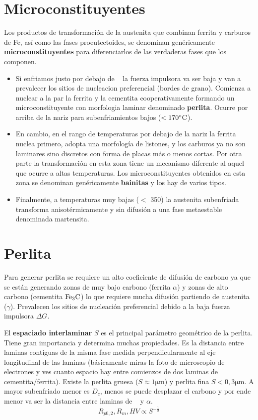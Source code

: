 \section{Microconstituyentes}
Los productos de transformación de la austenita que combinan
ferrita y carburos de Fe, así como las fases proeutectoides, se denominan genéricamente \textbf{microconstituyentes} para diferenciarlos de las verdaderas fases que los componen.
\begin{itemize}
    \item Si enfriamos justo por debajo de \Aone~ la fuerza impulsora va ser baja  y van a prevalecer los sitios de nucleacion preferencial (bordes de grano). Comienza a nuclear a la par la ferrita y la cementita cooperativamente formando un microconstituyente con morfologia laminar denominado \textbf{perlita}. Ocurre por arriba de la nariz para subenfriamientos bajos ($<170^\circ \mathrm{C}$).
    \item En cambio, en el rango de temperaturas por debajo de la nariz la ferrita nuclea primero, adopta una morfología de listones, y los carburos ya no son laminares sino discretos con forma de placas más o menos cortas. Por otra parte la transformación en esta zona tiene un mecanismo diferente al aquel que ocurre a altas temperaturas. Los microconstituyentes obtenidos en esta zona se denominan genéricamente \textbf{bainitas} y los hay de varios tipos.
    \item Finalmente, a temperaturas muy bajas ($<$ 350\grad) la austenita subenfriada transforma anisotérmicamente y sin difusión a una fase metaestable denominada martensita.
\end{itemize}


\section{Perlita}
Para generar perlita se requiere un alto coeficiente de difusión de carbono ya que se están generando zonas de muy bajo carbono (ferrita $\alpha$) y zonas de alto carbono (cementita $\mathrm{Fe}_3 \mathrm{C}$) lo que requiere mucha difusión partiendo de austenita ($\gamma$). Prevalecen los sitios de nucleación preferencial debido a la baja fuerza impulsora $\Delta G$.

El \textbf{espaciado interlaminar} $S$ es el principal parámetro geométrico de la perlita. Tiene gran importancia y determina muchas propiedades. Es la distancia entre laminas contiguas de la misma fase medida perpendicularmente al eje longitudinal de las laminas (básicamente miras la foto de microscopio de electrones y ves cuanto espacio hay entre comienzos de dos laminas de cementita/ferrita). Existe la perlita gruesa ($S\approx 1\si{\micro \meter}$) y perlita fina $S< 0,3\si{\micro \meter}$. A mayor subenfriado menor es $D_c$, menos se puede desplazar el carbono y por ende menor va ser la distancia entre laminas de \cementita~ y $\alpha$.
\begin{equation}\label{eq:StoPerliteStrength}
    R_{p 0,2}, R_{m}, H V \propto S^{-\frac{1}{2}}
\end{equation}

